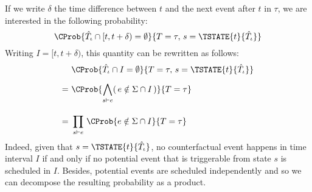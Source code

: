 If we write $\delta$ the time difference between $t$ and the next
event after $t$ in $\tau$, we are interested in the following
probability:
\begin{equation}
  \CProb{ \hat T_\iota \cap [t, t+\delta) = \emptyset  }
  { T=\tau,\, s = \TSTATE{t}{\hat T_\iota} }
\end{equation}
Writing $I = [t, t+\delta)$, this quantity can be rewritten as
follows:
\begin{align}
  \ & \ \CProb{ \hat T_\iota \cap I = \emptyset }
      { T=\tau,\, s = \TSTATE{t}{\hat T_\iota} } \\[0.5em]
  = & \ \CProb{ \bigwedge_{s \vdash e} (\,e \notin \Sigma \cap I \,)  }{ T=\tau } \\[1em]
  = & \ \prod_{s \vdash e}\, \CProb{e \notin \Sigma \cap I }{ T=\tau }
\end{align}
Indeed, given that $s = \TSTATE{t}{\hat T_\iota}$, no counterfactual
event happens in time interval $I$ if and only if no potential event
that is triggerable from state $s$ is scheduled in $I$.  Besides,
potential events are scheduled independently and so we can decompose
the resulting probability as a product.

